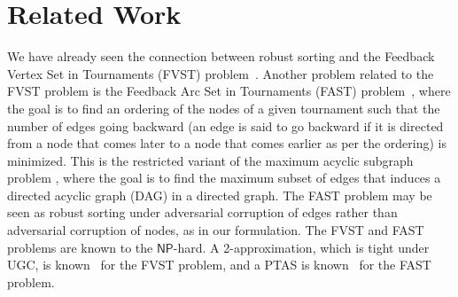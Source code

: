 \section{Related Work}
We have already seen the connection between robust sorting and the Feedback Vertex Set in Tournaments (FVST) problem~\cite{fvst,mnich16}. Another problem related to the FVST problem is the Feedback Arc Set in Tournaments (FAST) problem~\cite{acn08,ms07}, where the goal is to find an ordering of the nodes of a given tournament such that the number of edges going backward (an edge is said to go backward if it is directed from a node that comes later to a node that comes earlier as per the ordering) is minimized. This is the restricted variant of the maximum acyclic subgraph problem \cite{fk99}, where the goal is to find the maximum subset of edges that induces a directed acyclic graph (DAG) in a directed graph. The FAST problem may be seen as robust sorting under adversarial corruption of edges rather than adversarial corruption of nodes, as in our formulation. The FVST and FAST problems are known to the $\mathsf{NP}$-hard. A 2-approximation, which is tight under UGC, is known~\cite{fvst} for the FVST problem, and a PTAS is known~\cite{ms07} for the FAST problem. 

